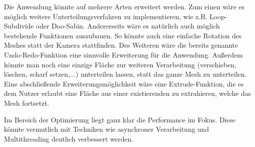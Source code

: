 Die Anwendung könnte auf mehrere Arten erweitert werden.
Zum einen wäre es möglich weitere Unterteilungsverfahren zu implementieren, wie z.B. Loop-Subdivide oder Doo-Sabin.
Andererseits wäre es natürlich auch möglich bestehende Funktionen auszubauen.
So könnte auch eine einfache Rotation des Meshes statt der Kamera stattfinden.
Des Weiteren wäre die bereits genannte Undo-Redo-Funktion eine sinnvolle Erweiterung für die Anwendung.
Au\ss{}erdem könnte man noch eine einzige Fläche zur weiteren Verarbeitung (verschieben, löschen, scharf setzen,...) unterteilen lassen, statt das ganze Mesh zu unterteilen.
Eine abschlie\ss{}ende Erweiterungsmöglichkeit wäre eine Extrude-Funktion, die es dem Nutzer erlaubt eine Fläche aus einer existierenden zu extrahieren, welche das Mesh fortsetzt.

Im Bereich der Optimierung liegt ganz klar die Performance im Fokus. 
Diese könnte vermutlich mit Techniken wie asynchroner Verarbeitung und Multithreading deutlich verbessert werden.
